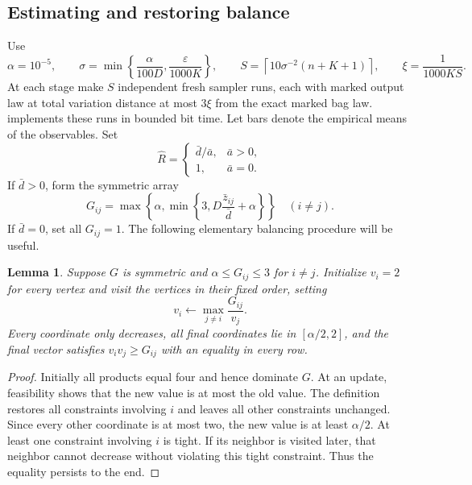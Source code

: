 \documentclass[11pt]{article}
\newtheorem{lemma}[theorem]{Lemma}
\theoremstyle{definition}
\theoremstyle{remark}
\newcommand{\eps}{\varepsilon}
\newcommand{\ceil}[1]{\left\lceil#1\right\rceil}
\numberwithin{equation}{section}
\begin{document}
\subsection{Estimating and restoring balance}
Use
\begin{equation}\label{eq:statistical-parameters}
 \alpha=10^{-5},\qquad
 \sigma=\min\left\{\frac\alpha{100D},\frac\eps{1000K}\right\},\qquad
 S=\ceil{10\sigma^{-2}(n+K+1)},\qquad
 \xi=\frac1{1000KS}.
\end{equation}
At each stage make $S$ independent fresh sampler runs, each with marked
output law at total variation distance at most $3\xi$ from the exact
marked bag law.  implements these runs in bounded
bit time. Let bars denote the empirical means of the observables.
Set
\begin{equation}\label{eq:ratio-estimate}
 \widehat R=
 \begin{cases}\bar d/\bar a,&\bar a>0,\\1,&\bar a=0.
 \end{cases}
\end{equation}
If $\bar d>0$, form the symmetric array
\begin{equation}\label{eq:upper-estimate}
 G_{ij}=\max\left\{\alpha,
             \min\left\{3,D\frac{\bar z_{ij}}{\bar d}+\alpha\right\}
                  \right\}
 \quad (i\ne j).
\end{equation}
If $\bar d=0$, set all $G_{ij}=1$. The following elementary balancing
procedure will be useful.

\begin{lemma}\label{lem:one-pass-scaling}
Suppose $G$ is symmetric and $\alpha\le G_{ij}\le3$ for $i\ne j$.
Initialize $v_i=2$ for every vertex and visit the vertices in their
fixed order, setting
\begin{equation}\label{eq:scale-update}
 v_i\leftarrow\max_{j\ne i}\frac{G_{ij}}{v_j}.
\end{equation}
Every coordinate only decreases, all final coordinates lie in
$[\alpha/2,2]$, and the final vector satisfies
$v_i v_j\ge G_{ij}$ with an equality in every row.
\end{lemma}
\begin{proof}
Initially all products equal four and hence dominate $G$. At an update,
feasibility shows that the new value is at most the old value. The
definition restores all constraints involving $i$ and leaves all other
constraints unchanged. Since every other coordinate is at most two,
the new value is at least $\alpha/2$. At least one constraint involving
$i$ is tight. If its neighbor is visited later, that neighbor cannot
decrease without violating this tight constraint. Thus the equality
persists to the end.
\end{proof}
\end{document}
